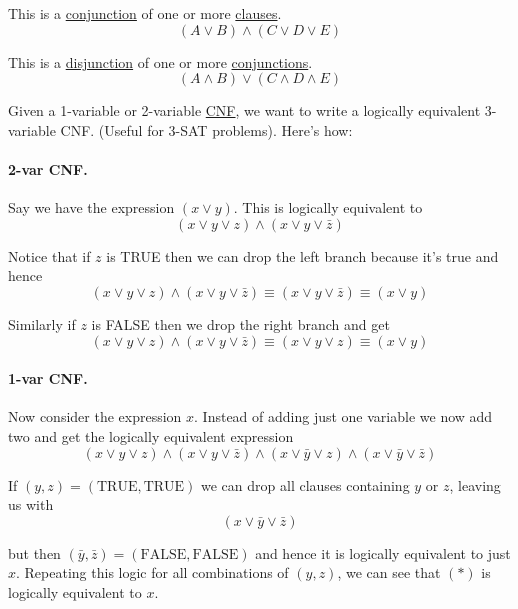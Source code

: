 \label{ab60bb1}

This is a \href{ba4e2fa}{conjunction} of one or more \href{ba4e2fa}{clauses}.
$$
  (A\lor B)\land (C\lor D\lor E)
$$

\label{bb41c04}

This is a \href{ba4e2fa}{disjunction} of one or more
\href{ba4e2fa}{conjunctions}.
$$
  (A\land B)\lor (C\land D\land E)
$$

\label{f33a84e}

Given a 1-variable or 2-variable \href{ab60bb1}{CNF}, we want to write a
logically equivalent 3-variable CNF. (Useful for 3-SAT problems). Here's how:

\paragraph{2-var CNF.} Say we have the expression $(x\lor y)$. This is logically equivalent to
$$
  (x\lor y\lor z)\land(x\lor y\lor\bar z)
$$

Notice that if $z$ is TRUE then we can drop the left branch because it's true
and hence
$$
  (x\lor y\lor z)\land(x\lor y\lor\bar z) \equiv(x\lor y\lor\bar z) \equiv (x\lor y)
$$

Similarly if $z$ is FALSE then we drop the right branch and get
$$
  (x\lor y\lor z)\land(x\lor y\lor\bar z) \equiv(x\lor y\lor z) \equiv (x\lor y)
$$

\paragraph{1-var CNF.} Now consider the expression $x$. Instead of adding just one variable we now add
two and get the logically equivalent expression
\begin{equation*}
  (x\lor y\lor z)\land
  (x\lor y\lor\bar z)\land
  (x\lor \bar y\lor z)\land
  (x\lor \bar y\lor\bar z)
\end{equation*}

If $(y,z)=(\text{TRUE},\text{TRUE})$ we can drop all clauses containing $y$ or
$z$, leaving us with
$$
  (x\lor \bar y\lor\bar z)
$$

but then $(\bar y,\bar z)=(\text{FALSE},\text{FALSE})$ and hence it is
logically equivalent to just $x$. Repeating this logic for all combinations of
$(y,z)$, we can see that $(*)$ is logically equivalent to $x$.


